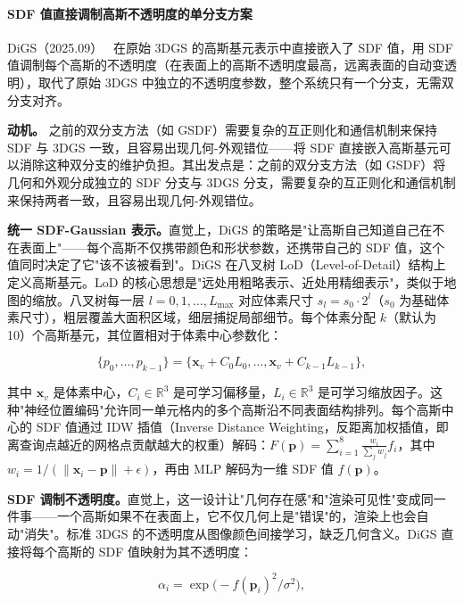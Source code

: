 \paragraph{SDF 值直接调制高斯不透明度的单分支方案}

DiGS（2025.09）~\cite{2509_07493} 在原始 3DGS 的高斯基元表示中直接嵌入了 SDF 值，用 SDF 值调制每个高斯的不透明度（在表面上的高斯不透明度最高，远离表面的自动变透明），取代了原始 3DGS 中独立的不透明度参数，整个系统只有一个分支，无需双分支对齐。

\textbf{动机。} 之前的双分支方法（如 GSDF）需要复杂的互正则化和通信机制来保持 SDF 与 3DGS 一致，且容易出现几何-外观错位——将 SDF 直接嵌入高斯基元可以消除这种双分支的维护负担。其出发点是：之前的双分支方法（如 GSDF）将几何和外观分成独立的 SDF 分支与 3DGS 分支，需要复杂的互正则化和通信机制来保持两者一致，且容易出现几何-外观错位。

\textbf{统一 SDF-Gaussian 表示。}直觉上，DiGS 的策略是"让高斯自己知道自己在不在表面上"——每个高斯不仅携带颜色和形状参数，还携带自己的 SDF 值，这个值同时决定了它"该不该被看到"。DiGS 在八叉树 LoD（Level-of-Detail）结构上定义高斯基元。LoD 的核心思想是"远处用粗略表示、近处用精细表示"，类似于地图的缩放。八叉树每一层 $l=0,1,\ldots,L_{\max}$ 对应体素尺寸 $s_l = s_0 \cdot 2^l$（$s_0$ 为基础体素尺寸），粗层覆盖大面积区域，细层捕捉局部细节。每个体素分配 $k$（默认为 10）个高斯基元，其位置相对于体素中心参数化：

\begin{equation}
\{p_0, \ldots, p_{k-1}\} = \{\mathbf{x}_v + C_0 L_0, \ldots, \mathbf{x}_v + C_{k-1} L_{k-1}\},
\end{equation}

其中 $\mathbf{x}_v$ 是体素中心，$C_i \in \mathbb{R}^3$ 是可学习偏移量，$L_i \in \mathbb{R}^3$ 是可学习缩放因子。这种"神经位置编码"允许同一单元格内的多个高斯沿不同表面结构排列。每个高斯中心的 SDF 值通过 IDW 插值（Inverse Distance Weighting，反距离加权插值，即离查询点越近的网格点贡献越大的权重）解码：$F(\mathbf{p}) = \sum_{i=1}^{8} \frac{w_i}{\sum_j w_j} f_i$，其中 $w_i = 1/(\|\mathbf{x}_i - \mathbf{p}\| + \epsilon)$，再由 MLP 解码为一维 SDF 值 $f(\mathbf{p})$。

\textbf{SDF 调制不透明度。}直觉上，这一设计让"几何存在感"和"渲染可见性"变成同一件事——一个高斯如果不在表面上，它不仅几何上是"错误"的，渲染上也会自动"消失"。标准 3DGS 的不透明度从图像颜色间接学习，缺乏几何含义。DiGS 直接将每个高斯的 SDF 值映射为其不透明度：

\begin{equation}
\alpha_i = \exp\!\big({-}f(\mathbf{p}_i)^2 / \sigma^2\big),
\end{equation}

